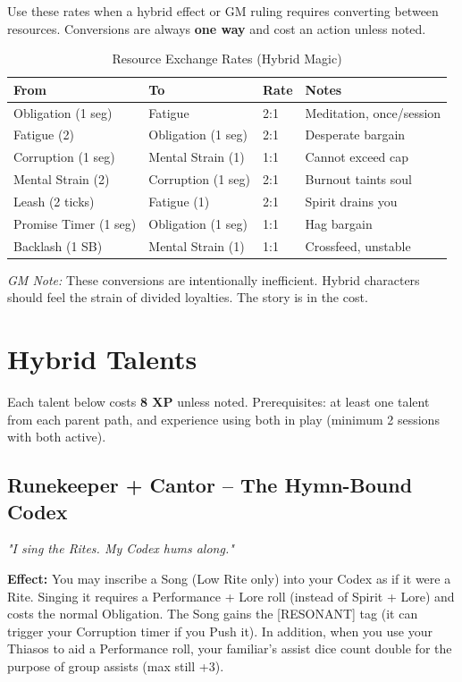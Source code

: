\documentclass[10pt,a5paper]{book}
\begin{document}
Use these rates when a hybrid effect or GM ruling requires converting between resources. Conversions are always \textbf{one way} and cost an action unless noted.

\small
\begin{longtable}{p{2.5cm} p{2.5cm} p{1.5cm} p{5cm}}
\caption{Resource Exchange Rates (Hybrid Magic)}\\
\toprule
\textbf{From} & \textbf{To} & \textbf{Rate} & \textbf{Notes} \\
\midrule
Obligation (1 seg) & Fatigue & 2:1 & Meditation, once/session \\
Fatigue (2) & Obligation (1 seg) & 2:1 & Desperate bargain \\
Corruption (1 seg) & Mental Strain (1) & 1:1 & Cannot exceed cap \\
Mental Strain (2) & Corruption (1 seg) & 2:1 & Burnout taints soul \\
Leash (2 ticks) & Fatigue (1) & 2:1 & Spirit drains you \\
Promise Timer (1 seg) & Obligation (1 seg) & 1:1 & Hag bargain \\
Backlash (1 SB) & Mental Strain (1) & 1:1 & Crossfeed, unstable \\
\bottomrule
\end{longtable}
\normalsize

\noindent \textit{GM Note:} These conversions are intentionally inefficient. Hybrid characters should feel the strain of divided loyalties. The story is in the cost.

\section*{Hybrid Talents}

Each talent below costs \textbf{8 XP} unless noted. Prerequisites: at least one talent from each parent path, and experience using both in play (minimum 2 sessions with both active).

\subsection*{Runekeeper + Cantor -- The Hymn-Bound Codex}

\textit{"I sing the Rites. My Codex hums along."}

\textbf{Effect:} You may inscribe a Song (Low Rite only) into your Codex as if it were a Rite. Singing it requires a Performance + Lore roll (instead of Spirit + Lore) and costs the normal Obligation. The Song gains the [RESONANT] tag (it can trigger your Corruption timer if you Push it). In addition, when you use your Thiasos to aid a Performance roll, your familiar's assist dice count double for the purpose of group assists (max still +3).
\end{document}
